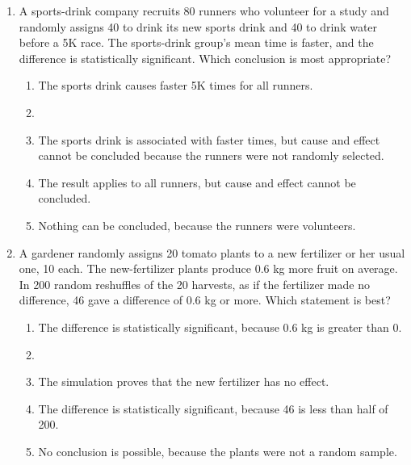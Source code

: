 \documentclass[12pt]{article}
\begin{document}
\begin{enumerate}[leftmargin=1.9em, itemsep=0.10in]

  \item A sports-drink company recruits 80 runners who volunteer for a study and randomly
        assigns 40 to drink its new sports drink and 40 to drink water before a 5K race. The
        sports-drink group's mean time is faster, and the difference is statistically
        significant. Which conclusion is most appropriate?
        \begin{enumerate}[label=\textbf{(\Alph*)}, leftmargin=2.2em, itemsep=1pt]
          \item The sports drink causes faster 5K times for all runners.
          \item {}
          \item The sports drink is associated with faster times, but cause and effect cannot
                be concluded because the runners were not randomly selected.
          \item The result applies to all runners, but cause and effect cannot be concluded.
          \item Nothing can be concluded, because the runners were volunteers.
                \hfill{}\rule[-0.2in]{0pt}{0.48in}
        \end{enumerate}

  \item A gardener randomly assigns 20 tomato plants to a new fertilizer or her usual one, 10
        each. The new-fertilizer plants produce 0.6 kg more fruit on average. In 200 random
        reshuffles of the 20 harvests, as if the fertilizer made no difference, 46 gave a
        difference of 0.6 kg or more. Which statement is best?
        \begin{enumerate}[label=\textbf{(\Alph*)}, leftmargin=2.2em, itemsep=1pt]
          \item The difference is statistically significant, because 0.6 kg is greater than 0.
          \item {}
          \item The simulation proves that the new fertilizer has no effect.
          \item The difference is statistically significant, because 46 is less than half of 200.
          \item No conclusion is possible, because the plants were not a random sample.
                \hfill{}\rule[-0.2in]{0pt}{0.48in}
        \end{enumerate}

\end{enumerate}
\end{document}
